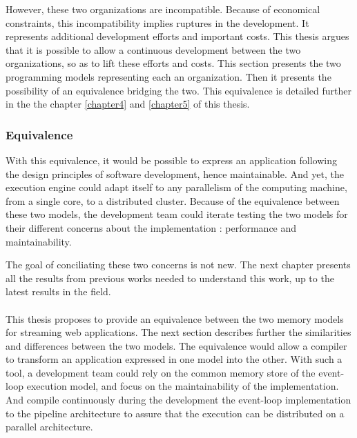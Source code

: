 However, these two organizations are incompatible.
Because of economical constraints, this incompatibility implies ruptures in the development.
It represents additional development efforts and important costs.
This thesis argues that it is possible to allow a continuous development between the two organizations, so as to lift these efforts and costs.
This section presents the two programming models representing each an organization.
Then it presents the possibility of an equivalence bridging the two.
This equivalence is detailed further in the the chapter \ref{chapter4} and \ref{chapter5} of this thesis.

\subsubsection{Equivalence}

With this equivalence, it would be possible to express an application following the design principles of software development, hence maintainable.
And yet, the execution engine could adapt itself to any parallelism of the computing machine, from a single core, to a distributed cluster.
Because of the equivalence between these two models, the development team could iterate testing the two models for their different concerns about the implementation : performance and maintainability.

The goal of conciliating these two concerns is not new.
The next chapter presents all the results from previous works needed to understand this work, up to the latest results in the field.

\paragraph{}

This thesis proposes to provide an equivalence between the two memory models for streaming web applications.
The next section describes further the similarities and differences between the two models.
The equivalence would allow a compiler to transform an application expressed in one model into the other.
With such a tool, a development team could rely on the common memory store of the event-loop execution model, and focus on the maintainability of the implementation.
And compile continuously during the development the event-loop implementation to the pipeline architecture to assure that the execution can be distributed on a parallel architecture.
